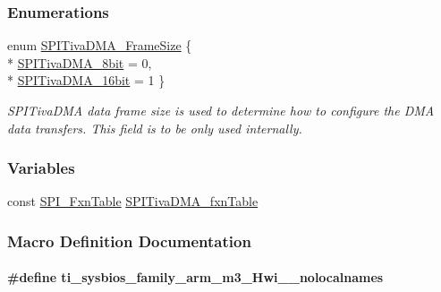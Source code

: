\subsubsection*{Enumerations}
\begin{DoxyCompactItemize}
\item 
enum \hyperlink{_s_p_i_tiva_d_m_a_8h_a65cb55b42cf383ece69876f50ba2d0a4}{S\+P\+I\+Tiva\+D\+M\+A\+\_\+\+Frame\+Size} \{ \\*
\hyperlink{_s_p_i_tiva_d_m_a_8h_a65cb55b42cf383ece69876f50ba2d0a4aa58606ada645870d2aaef1405aa44544}{S\+P\+I\+Tiva\+D\+M\+A\+\_\+8bit} = 0, 
\\*
\hyperlink{_s_p_i_tiva_d_m_a_8h_a65cb55b42cf383ece69876f50ba2d0a4a4db41d561526d534aa9a0d806a49d42a}{S\+P\+I\+Tiva\+D\+M\+A\+\_\+16bit} = 1
 \}
\begin{DoxyCompactList}\small\item\em S\+P\+I\+Tiva\+D\+M\+A data frame size is used to determine how to configure the D\+M\+A data transfers. This field is to be only used internally. \end{DoxyCompactList}\end{DoxyCompactItemize}
\subsubsection*{Variables}
\begin{DoxyCompactItemize}
\item 
const \hyperlink{struct_s_p_i___fxn_table}{S\+P\+I\+\_\+\+Fxn\+Table} \hyperlink{_s_p_i_tiva_d_m_a_8h_a9802f6bf37a0ffb9e685352a7334aa91}{S\+P\+I\+Tiva\+D\+M\+A\+\_\+fxn\+Table}
\end{DoxyCompactItemize}


\subsubsection{Macro Definition Documentation}
\paragraph[{ti\+\_\+sysbios\+\_\+family\+\_\+arm\+\_\+m3\+\_\+\+Hwi\+\_\+\+\_\+nolocalnames}]{\setlength{\rightskip}{0pt plus 5cm}\#define ti\+\_\+sysbios\+\_\+family\+\_\+arm\+\_\+m3\+\_\+\+Hwi\+\_\+\+\_\+nolocalnames}\label{_s_p_i_tiva_d_m_a_8h_aaa17ecf48f5762e2e1bdb0bab8aacf0c}


